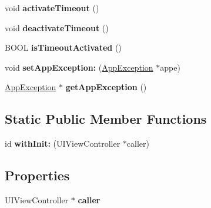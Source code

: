 \begin{DoxyCompactItemize}
\item 
\hypertarget{interface_command_context_a2c6073266e4ec22ac6b6227ce56e2bd6}{
void {\bfseries activate\-Timeout} ()}
\label{interface_command_context_a2c6073266e4ec22ac6b6227ce56e2bd6}

\item 
\hypertarget{interface_command_context_a7c19633dd9421913e6a63078150583c8}{
void {\bfseries deactivate\-Timeout} ()}
\label{interface_command_context_a7c19633dd9421913e6a63078150583c8}

\item 
\hypertarget{interface_command_context_a5f72d0c0ca42b8502fa2580acbf62204}{
\-B\-O\-O\-L {\bfseries is\-Timeout\-Activated} ()}
\label{interface_command_context_a5f72d0c0ca42b8502fa2580acbf62204}

\item 
\hypertarget{interface_command_context_a489082496684047d76503079a74eac3e}{
void {\bfseries set\-App\-Exception\-:} (\hyperlink{interface_app_exception}{\-App\-Exception} $\ast$appe)}
\label{interface_command_context_a489082496684047d76503079a74eac3e}

\item 
\hypertarget{interface_command_context_a384335d72d424590c7e98f23b97bcc00}{
\hyperlink{interface_app_exception}{\-App\-Exception} $\ast$ {\bfseries get\-App\-Exception} ()}
\label{interface_command_context_a384335d72d424590c7e98f23b97bcc00}

\end{DoxyCompactItemize}
\subsection*{\-Static \-Public \-Member \-Functions}
\begin{DoxyCompactItemize}
\item 
\hypertarget{interface_command_context_a7e3659ae01648b7db18812a2b1e4cf5c}{
id {\bfseries with\-Init\-:} (\-U\-I\-View\-Controller $\ast$caller)}
\label{interface_command_context_a7e3659ae01648b7db18812a2b1e4cf5c}

\end{DoxyCompactItemize}
\subsection*{\-Properties}
\begin{DoxyCompactItemize}
\item 
\hypertarget{interface_command_context_a3da5c5d788e8d7402907548f7725614c}{
\-U\-I\-View\-Controller $\ast$ {\bfseries caller}}
\label{interface_command_context_a3da5c5d788e8d7402907548f7725614c}

\end{DoxyCompactItemize}


